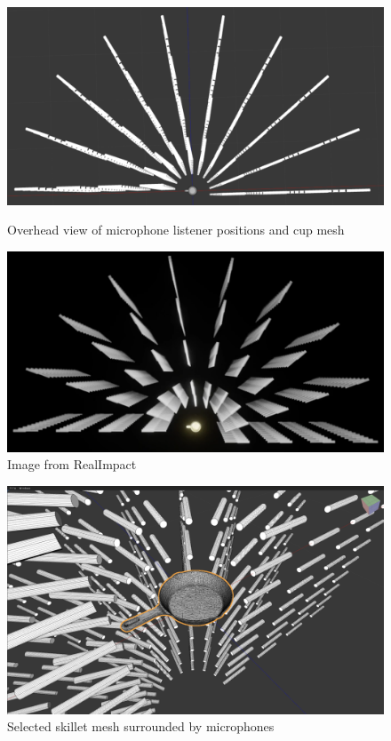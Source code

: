 \documentclass[12pt]{article}
\begin{document}
\begin{figure}[H]
    \centering
    \begin{minipage}[t]{0.45\linewidth}
        \includegraphics[width=\linewidth]{overhead_mic_view.png}
        \caption{Overhead view of microphone listener positions and cup mesh}
        \label{fig:mic_overhead}
    \end{minipage}
    \begin{minipage}[t]{0.45\linewidth}
        \includegraphics[width=\linewidth]{overhead_mic_comparison.png}
        \caption{Image from RealImpact}
        \label{fig:mic_overhead_compare}
    \end{minipage}
\end{figure}


\begin{figure}[H]
    \centering
    \begin{minipage}[t]{0.65\linewidth}
        \includegraphics[width=\linewidth]{real_impact_skillet.png}
        \caption{Selected skillet mesh surrounded by microphones}
        \label{fig:skillet}
    \end{minipage}
\end{figure}




\end{document}
